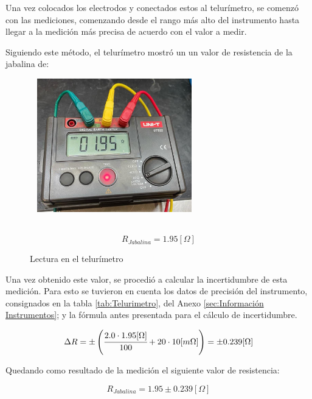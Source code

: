 Una vez colocados los electrodos y conectados estos al telurímetro, se comenzó con las mediciones, comenzando desde el rango más alto del instrumento hasta llegar a la medición más precisa de acuerdo con el valor a medir. 

Siguiendo este método, el telurímetro mostró un un valor de resistencia de la jabalina de:

\begin{figure}[h!]
    \begin{minipage}{0.6\textwidth}\
        \centering  
        \includegraphics[width=0.6\textwidth]{Imagenes/Lecttel.jpeg}
        \caption{Lectura en el telurímetro}
        \label{fig:lecttel}
    \end{minipage}
    \begin{minipage}{0.39\textwidth}\
        \begin{equation*}
            R_{Jabalina} = 1.95 [\Omega]
        \end{equation*}
    \end{minipage}
\end{figure}

Una vez obtenido este valor, se procedió a calcular la incertidumbre de esta medición. Para esto se tuvieron en cuenta los datos de precisión del instrumento, consignados en la tabla \ref{tab:Telurimetro}, del Anexo \ref{sec:Información Instrumentos}; y la fórmula antes presentada para el cálculo de incertidumbre.

\begin{equation}
    \Delta R = \pm \left( \cfrac{2.0 \cdot 1.95 [\Omega]}{100} + 20 \cdot 10 [m\Omega] \right) = \pm 0.239 [\Omega]  
\end{equation}

Quedando como resultado de la medición el siguiente valor de resistencia:

\begin{equation*}
    R_{Jabalina} = 1.95 \pm 0.239 [\Omega]
\end{equation*}

